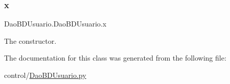 \subsubsection{\texorpdfstring{x}{x}}
{\footnotesize\ttfamily Dao\+B\+D\+Usuario.\+Dao\+B\+D\+Usuario.\+x}



The constructor. 



The documentation for this class was generated from the following file\+:\begin{DoxyCompactItemize}
\item 
control/\mbox{\hyperlink{_dao_b_d_usuario_8py}{Dao\+B\+D\+Usuario.\+py}}\end{DoxyCompactItemize}
